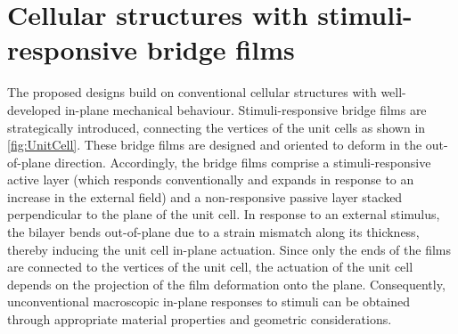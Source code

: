 \documentclass[final,times,5p]{elsarticle}
\numberwithin{equation}{section}
\begin{document}

\section{Cellular structures with stimuli-responsive bridge films}
The proposed designs build on conventional cellular structures with well-developed in-plane mechanical behaviour. Stimuli-responsive bridge films are strategically introduced, connecting the vertices of the unit cells as shown in \cref{fig:UnitCell}. These bridge films are designed and oriented to deform in the out-of-plane direction. Accordingly, the bridge films comprise a stimuli-responsive active layer (which responds conventionally and expands in response to an increase in the external field) and a non-responsive passive layer stacked perpendicular to the plane of the unit cell. In response to an external stimulus, the bilayer bends out-of-plane due to a strain mismatch along its thickness, thereby inducing the unit cell in-plane actuation. Since only the ends of the films are connected to the vertices of the unit cell, the actuation of the unit cell depends on the projection of the film deformation onto the plane. Consequently, unconventional macroscopic in-plane responses to stimuli can be obtained through appropriate material properties and geometric considerations.
\end{document}
